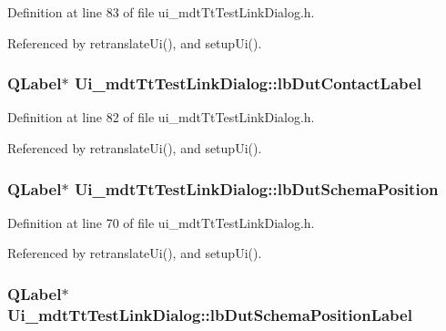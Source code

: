 Definition at line 83 of file ui\-\_\-mdt\-Tt\-Test\-Link\-Dialog.\-h.



Referenced by retranslate\-Ui(), and setup\-Ui().

\hypertarget{class_ui__mdt_tt_test_link_dialog_a19f54b3891513fe5a26a74f953d93869}{
\subsubsection[{lb\-Dut\-Contact\-Label}]{\setlength{\rightskip}{0pt plus 5cm}Q\-Label$\ast$ Ui\-\_\-mdt\-Tt\-Test\-Link\-Dialog\-::lb\-Dut\-Contact\-Label}}\label{class_ui__mdt_tt_test_link_dialog_a19f54b3891513fe5a26a74f953d93869}


Definition at line 82 of file ui\-\_\-mdt\-Tt\-Test\-Link\-Dialog.\-h.



Referenced by retranslate\-Ui(), and setup\-Ui().

\hypertarget{class_ui__mdt_tt_test_link_dialog_a432cc3d990ac644d1eaa04417b2bc25e}{
\subsubsection[{lb\-Dut\-Schema\-Position}]{\setlength{\rightskip}{0pt plus 5cm}Q\-Label$\ast$ Ui\-\_\-mdt\-Tt\-Test\-Link\-Dialog\-::lb\-Dut\-Schema\-Position}}\label{class_ui__mdt_tt_test_link_dialog_a432cc3d990ac644d1eaa04417b2bc25e}


Definition at line 70 of file ui\-\_\-mdt\-Tt\-Test\-Link\-Dialog.\-h.



Referenced by retranslate\-Ui(), and setup\-Ui().

\hypertarget{class_ui__mdt_tt_test_link_dialog_a4f1204263363d26678290b4e8260e9c4}{
\subsubsection[{lb\-Dut\-Schema\-Position\-Label}]{\setlength{\rightskip}{0pt plus 5cm}Q\-Label$\ast$ Ui\-\_\-mdt\-Tt\-Test\-Link\-Dialog\-::lb\-Dut\-Schema\-Position\-Label}}\label{class_ui__mdt_tt_test_link_dialog_a4f1204263363d26678290b4e8260e9c4}


